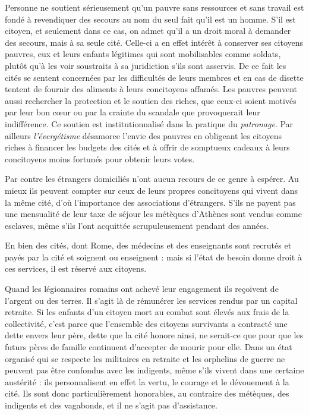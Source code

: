  Personne ne soutient sérieusement qu'un pauvre sans ressources et sans travail est fondé à revendiquer des secours au nom du seul fait qu'il est un homme. S'il est citoyen, et seulement dans ce cas, on admet qu'il a un droit moral à demander des secours, mais à sa seule cité. Celle-ci a en effet intérêt à conserver ses citoyens pauvres, eux et leurs enfants légitimes qui sont mobilisables comme soldats, plutôt qu'à les voir soustraits à sa juridiction s'ils sont asservis. De ce fait les cités se sentent concernées par les difficultés de leurs membres et en cas de disette tentent de fournir des aliments à leurs concitoyens affamés. Les pauvres peuvent aussi rechercher la protection et le soutien des riches, que ceux-ci soient motivés par leur bon cœur ou par la crainte du scandale que provoquerait leur indifférence. Ce soutien est institutionnalisé dans la pratique du \emph{patronage}. Par ailleurs \emph{l'évergétisme} désamorce l'envie des pauvres en obligeant les citoyens riches à financer les budgets des cités et à offrir de somptueux cadeaux à leurs concitoyens moins fortunés pour obtenir leurs votes.

 Par contre les étrangers domiciliés n'ont aucun recours de ce genre à espérer. Au mieux ils peuvent compter sur ceux de leurs propres concitoyens qui vivent dans la même cité, d'où l'importance des associations d'étrangers. S'ils ne payent pas une mensualité de leur taxe de séjour les métèques d'Athènes sont vendus comme esclaves, même s'ils l'ont acquittée scrupuleusement pendant des années.

 En bien des cités, dont Rome, des médecins et des enseignants sont recrutés et payés par la cité et soignent ou enseignent : mais si l'état de besoin donne droit à ces services, il est réservé aux citoyens. 

 Quand les légionnaires romains ont achevé leur engagement ils reçoivent de l'argent ou des terres. Il s'agit là de rémunérer les services rendus par un capital retraite. Si les enfants d'un citoyen mort au combat sont élevés aux frais de la collectivité, c'est parce que l'ensemble des citoyens survivants a contracté une dette envers leur père, dette que la cité honore ainsi, ne serait-ce que pour que les futurs pères de famille continuent d'accepter de mourir pour elle. Dans un état organisé qui se respecte les militaires en retraite et les orphelins de guerre ne peuvent pas être confondus avec les indigents, même s'ils vivent dans une certaine austérité : ils personnalisent en effet la vertu, le courage et le dévouement à la cité. Ils sont donc particulièrement honorables, au contraire des métèques, des indigents et des vagabonds, et il ne s'agit pas d'assistance.

